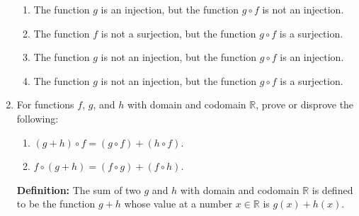 \documentclass[12pt]{article}
\newcommand{\RR}{{\mathbb R}}  %
\begin{document}
\begin{enumerate}
\begin{enumerate}
  \item The function $g$ is an injection, but the function $g\circ f$ is not an injection.

  \item The function $f$ is not a surjection, but the function $g\circ f$ is a surjection.

  \item The function $g$ is not an injection, but the function $g\circ f$ is an injection.

  \item The function $g$ is not an injection, but the function $g\circ f$ is a surjection.

 \end{enumerate}  



\item  For functions $f$, $g$, and $h$ with domain and codomain $\RR$, prove or disprove the following:
  
 \begin{enumerate}
    \item   $(g+h)\circ f = (g\circ f) + (h\circ f)$.

    \item   $f\circ(g+h) = (f\circ g) + (f\circ h)$.   

 \end{enumerate}  

  {\bf Definition:} The sum of two $g$ and $h$  with domain and codomain $\RR$ is defined to be the function $g+h$ whose value at a number
  $x\in \RR$ is $g(x)+h(x)$.
 

\end{enumerate}
\end{document}
